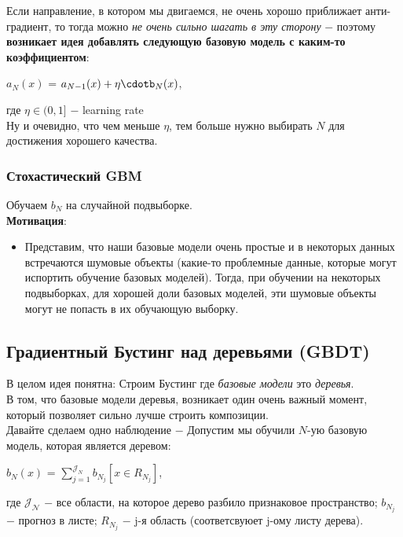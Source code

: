            Если направление, в котором мы двигаемся, не очень хорошо приближает анти-градиент, то тогда можно \textit{не очень сильно шагать в эту сторону} $-$ поэтому \textbf{возникает идея добавлять следующую базовую модель с каким-то коэффициентом}:
           \begin{center}
           \Large
               $a_N(x)$ = $a_{N - 1}(x) + \eta\cdotb_N(x)$,
           \end{center}
           где $\eta \in (0, 1]$ $-$ learning rate\\

           Ну и очевидно, что чем меньше $\eta$, тем больше нужно выбирать $N$ для достижения хорошего качества.

        \subsubsection{Стохастический GBM}
            Обучаем $b_N$ на случайной подвыборке.\\

            \textbf{Мотивация}:
            \begin{itemize}
                \item Представим, что наши базовые модели очень простые и в некоторых данных встречаются шумовые объекты (какие-то проблемные данные, которые могут испортить обучение базовых моделей). Тогда, при обучении на некоторых подвыборках, для хорошей доли базовых моделей, эти шумовые объекты могут не попасть в их обучающую выборку. 
            \end{itemize}

    \subsection{Градиентный Бустинг над деревьями (GBDT)}

        В целом идея понятна: Строим Бустинг где \textit{базовые модели} это \textit{деревья}.\\

        В том, что базовые модели деревья, возникает один очень важный момент, который позволяет сильно лучше строить композиции.\\

        Давайте сделаем одно наблюдение $-$ Допустим мы обучили $N$-ую базовую модель, которая является деревом:
        \begin{center}
            $b_N(x)$ = $\sum\limits_{j = 1}^{\mathcal{J}_N }b_{N_j}[x \in R_{N_j}]$,
        \end{center}
        где $\mathcal{J_N}$ $-$ все области, на которое дерево разбило признаковое пространство; \quad $b_{N_j}$ $-$ прогноз в листе; \quad $R_{N_j}$ $-$ j-я область (соответсвуюет j-ому листу дерева).\\

